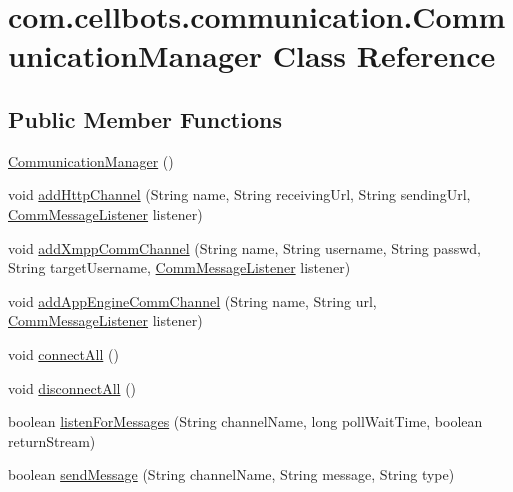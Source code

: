 \hypertarget{classcom_1_1cellbots_1_1communication_1_1_communication_manager}{\section{com.\-cellbots.\-communication.\-Communication\-Manager Class Reference}
\label{classcom_1_1cellbots_1_1communication_1_1_communication_manager}
}
\subsection*{Public Member Functions}
\begin{DoxyCompactItemize}
\item 
\hyperlink{classcom_1_1cellbots_1_1communication_1_1_communication_manager_ad74c4c8a8a056c6e10a6e71baa728955}{Communication\-Manager} ()
\item 
void \hyperlink{classcom_1_1cellbots_1_1communication_1_1_communication_manager_a401349d7b51a313ac305e751398021dc}{add\-Http\-Channel} (String name, String receiving\-Url, String sending\-Url, \hyperlink{interfacecom_1_1cellbots_1_1communication_1_1_abstract_comm_channel_1_1_comm_message_listener}{Comm\-Message\-Listener} listener)
\item 
void \hyperlink{classcom_1_1cellbots_1_1communication_1_1_communication_manager_a9798c0480dfed8dbc16544f3cd5a2ddb}{add\-Xmpp\-Comm\-Channel} (String name, String username, String passwd, String target\-Username, \hyperlink{interfacecom_1_1cellbots_1_1communication_1_1_abstract_comm_channel_1_1_comm_message_listener}{Comm\-Message\-Listener} listener)
\item 
void \hyperlink{classcom_1_1cellbots_1_1communication_1_1_communication_manager_a2ba106b259b3ca7e79b8f18572a8ccef}{add\-App\-Engine\-Comm\-Channel} (String name, String url, \hyperlink{interfacecom_1_1cellbots_1_1communication_1_1_abstract_comm_channel_1_1_comm_message_listener}{Comm\-Message\-Listener} listener)
\item 
void \hyperlink{classcom_1_1cellbots_1_1communication_1_1_communication_manager_adab1f815ff3e098cdd8a1baf311d4973}{connect\-All} ()
\item 
void \hyperlink{classcom_1_1cellbots_1_1communication_1_1_communication_manager_ae369d02d00ce94d22b28b4762eb174e8}{disconnect\-All} ()
\item 
boolean \hyperlink{classcom_1_1cellbots_1_1communication_1_1_communication_manager_a7ce275088d93d33cfe98a2a74136bf10}{listen\-For\-Messages} (String channel\-Name, long poll\-Wait\-Time, boolean return\-Stream)
\item 
boolean \hyperlink{classcom_1_1cellbots_1_1communication_1_1_communication_manager_af138e3047693692c3debbc097530fe1a}{send\-Message} (String channel\-Name, String message, String type)
\end{DoxyCompactItemize}
